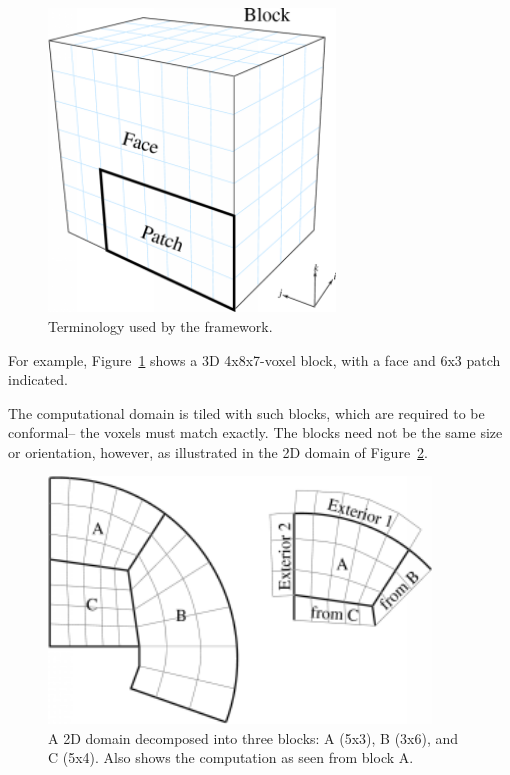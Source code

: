 \documentclass[10pt]{article}
\begin{document}
\begin{figure}[h]
\begin{center}
\includegraphics[width=3in]{fig/terminology}
\end{center}
\caption{Terminology used by the framework.}
\label{fig:terminology}
\end{figure}

For example, Figure~\ref{fig:terminology} shows a 3D
4x8x7-voxel block, with a face and 6x3 patch indicated.

The computational domain is tiled with such blocks, which 
are required to be conformal-- the voxels must match exactly.
The blocks need not be the same size or orientation, however,
as illustrated in the 2D domain of Figure~\ref{fig:decompose}.

\begin{figure}[h]
\begin{center}
\includegraphics[width=4in]{fig/decompose}
\end{center}
\caption{A 2D domain decomposed into three blocks: A (5x3), B (3x6), 
and C (5x4). Also shows the computation as seen from block A.}
\label{fig:decompose}
\end{figure}
\end{document}
